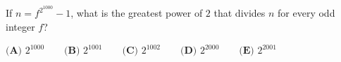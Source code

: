 If $n=f^{2^{1000}}-1$, what is the greatest power of $2$ that divides $n$ for every odd integer $f$?

$\textbf{(A) } 2^{1000} \qquad \textbf{(B) } 2^{1001} \qquad \textbf{(C) } 2^{1002} \qquad \textbf{(D) } 2^{2000} \qquad \textbf{(E) } 2^{2001}$
